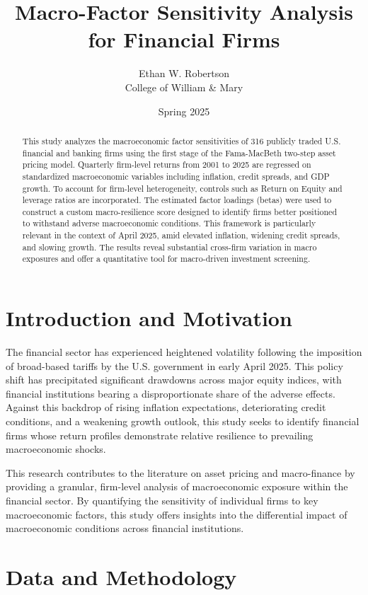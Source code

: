 \documentclass[12pt]{article}
\title{Macro-Factor Sensitivity Analysis for Financial Firms}
\author{Ethan W. Robertson \\ College of William \& Mary}
\date{Spring 2025}
\begin{document}
\maketitle

\begin{abstract}
This study analyzes the macroeconomic factor sensitivities of 316 publicly traded U.S. financial and banking firms using the first stage of the Fama-MacBeth two-step asset pricing model. Quarterly firm-level returns from 2001 to 2025 are regressed on standardized macroeconomic variables including inflation, credit spreads, and GDP growth. To account for firm-level heterogeneity, controls such as Return on Equity and leverage ratios are incorporated. The estimated factor loadings (betas) were used to construct a custom macro-resilience score designed to identify firms better positioned to withstand adverse macroeconomic conditions. This framework is particularly relevant in the context of April 2025, amid elevated inflation, widening credit spreads, and slowing growth. The results reveal substantial cross-firm variation in macro exposures and offer a quantitative tool for macro-driven investment screening.
\end{abstract}

\section{Introduction and Motivation}

The financial sector has experienced heightened volatility following the imposition of broad-based tariffs by the U.S. government in early April 2025. This policy shift has precipitated significant drawdowns across major equity indices, with financial institutions bearing a disproportionate share of the adverse effects. Against this backdrop of rising inflation expectations, deteriorating credit conditions, and a weakening growth outlook, this study seeks to identify financial firms whose return profiles demonstrate relative resilience to prevailing macroeconomic shocks.

This research contributes to the literature on asset pricing and macro-finance by providing a granular, firm-level analysis of macroeconomic exposure within the financial sector. By quantifying the sensitivity of individual firms to key macroeconomic factors, this study offers insights into the differential impact of macroeconomic conditions across financial institutions.

\section{Data and Methodology}
\end{document}

